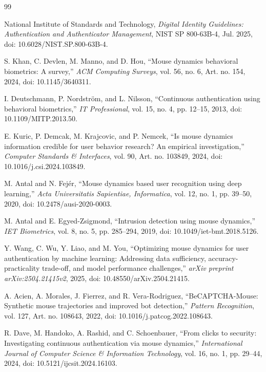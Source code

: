 \documentclass[conference]{IEEEtran}
\begin{document}
\begin{thebibliography}{99}

National Institute of Standards and Technology,
\emph{Digital Identity Guidelines: Authentication and Authenticator Management},
NIST SP 800-63B-4, Jul. 2025, doi: 10.6028/NIST.SP.800-63B-4.

S. Khan, C. Devlen, M. Manno, and D. Hou,
``Mouse dynamics behavioral biometrics: A survey,''
\emph{ACM Computing Surveys},
vol. 56, no. 6, Art. no. 154, 2024,
doi: 10.1145/3640311.

I. Deutschmann, P. Nordstr{\"o}m, and L. Nilsson,
``Continuous authentication using behavioral biometrics,''
\emph{IT Professional},
vol. 15, no. 4, pp. 12--15, 2013,
doi: 10.1109/MITP.2013.50.

E. Kuric, P. Demcak, M. Krajcovic, and P. Nemcek,
``Is mouse dynamics information credible for user behavior research? An empirical investigation,''
\emph{Computer Standards \& Interfaces},
vol. 90, Art. no. 103849, 2024,
doi: 10.1016/j.csi.2024.103849.

M. Antal and N. Fej{\'e}r,
``Mouse dynamics based user recognition using deep learning,''
\emph{Acta Universitatis Sapientiae, Informatica},
vol. 12, no. 1, pp. 39--50, 2020,
doi: 10.2478/ausi-2020-0003.

M. Antal and E. Egyed-Zsigmond,
``Intrusion detection using mouse dynamics,''
\emph{IET Biometrics},
vol. 8, no. 5, pp. 285--294, 2019,
doi: 10.1049/iet-bmt.2018.5126.

Y. Wang, C. Wu, Y. Liao, and M. You,
``Optimizing mouse dynamics for user authentication by machine learning:
Addressing data sufficiency, accuracy-practicality trade-off, and model
performance challenges,''
\emph{arXiv preprint arXiv:2504.21415v2}, 2025,
doi: 10.48550/arXiv.2504.21415.

A. Acien, A. Morales, J. Fierrez, and R. Vera-Rodriguez,
``BeCAPTCHA-Mouse: Synthetic mouse trajectories and improved bot detection,''
\emph{Pattern Recognition}, vol. 127, Art. no. 108643, 2022,
doi: 10.1016/j.patcog.2022.108643.

R. Dave, M. Handoko, A. Rashid, and C. Schoenbauer,
``From clicks to security: Investigating continuous authentication via mouse dynamics,''
\emph{International Journal of Computer Science \& Information Technology},
vol. 16, no. 1, pp. 29--44, 2024, doi: 10.5121/ijcsit.2024.16103.


\end{thebibliography}
\end{document}
